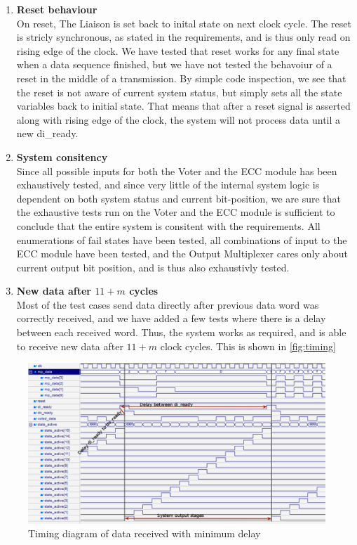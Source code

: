 \begin{enumerate}
    \item{\textbf{Reset behaviour}} \hfill\\
        On reset, The Liaison is set back to inital state on next clock cycle. The reset is stricly synchronous,
        as stated in the requirements\cite{task}, and is thus only read on rising edge of the clock. We have
        tested that reset works for any final state when a data sequence finished, but we have not tested the
        behavoiur of a reset in the middle of a transmission. By simple code inspection, we see that the
        reset is not aware of current system status, but simply sets all the state variables back to initial
        state. That means that after a reset signal is asserted along with rising edge of the clock, the system
        will not process data until a new {\ttfamily di\_ready}.

    \item{\textbf{System consitency}} \hfill\\
        Since all possible inputs for both the Voter and the ECC module has been exhaustively tested, and 
        since very little of the internal system logic is dependent on both system status and current bit-position,
        we are sure that the exhaustive tests run on the Voter and the ECC module is sufficient to conclude that 
        the entire system is consitent with the requirements. All enumerations of fail states have been tested, all combinations
        of input to the ECC module have been tested, and the Output Multiplexer cares only about current output bit position,
        and is thus also exhaustivly tested.

    \item{\textbf{New data after $11+m$ cycles}} \hfill\\
        Most of the test cases send data directly after previous data word was correctly received, and we have
        added a few tests where there is a delay between each received word. Thus, the system works as required,
        and is able to receive new data after $11+m$ clock cycles. This is shown in \autoref{fig:timing}

\end{enumerate}

\begin{figure}
    \includegraphics[width=\textwidth]{tests/timing}
    \caption{Timing diagram of data received with minimum delay}
    \label{fig:timing}
\end{figure}
